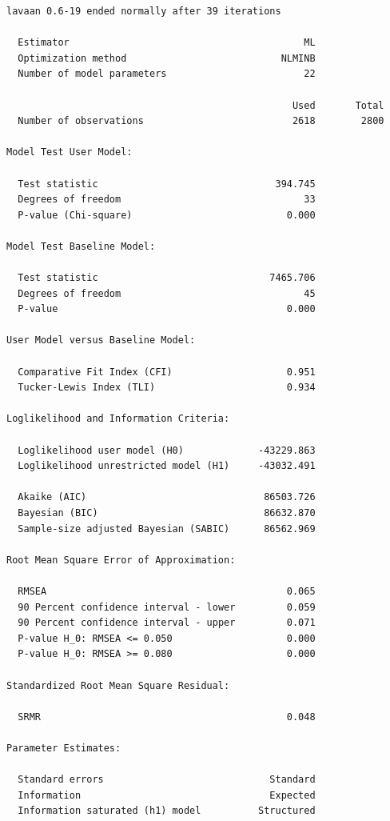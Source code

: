 \documentclass[
  letterpaper,
  DIV=11,
  numbers=noendperiod]{scrreprt}
\begin{document}
\begin{verbatim}
lavaan 0.6-19 ended normally after 39 iterations

  Estimator                                         ML
  Optimization method                           NLMINB
  Number of model parameters                        22

                                                  Used       Total
  Number of observations                          2618        2800

Model Test User Model:
                                                      
  Test statistic                               394.745
  Degrees of freedom                                33
  P-value (Chi-square)                           0.000

Model Test Baseline Model:

  Test statistic                              7465.706
  Degrees of freedom                                45
  P-value                                        0.000

User Model versus Baseline Model:

  Comparative Fit Index (CFI)                    0.951
  Tucker-Lewis Index (TLI)                       0.934

Loglikelihood and Information Criteria:

  Loglikelihood user model (H0)             -43229.863
  Loglikelihood unrestricted model (H1)     -43032.491
                                                      
  Akaike (AIC)                               86503.726
  Bayesian (BIC)                             86632.870
  Sample-size adjusted Bayesian (SABIC)      86562.969

Root Mean Square Error of Approximation:

  RMSEA                                          0.065
  90 Percent confidence interval - lower         0.059
  90 Percent confidence interval - upper         0.071
  P-value H_0: RMSEA <= 0.050                    0.000
  P-value H_0: RMSEA >= 0.080                    0.000

Standardized Root Mean Square Residual:

  SRMR                                           0.048

Parameter Estimates:

  Standard errors                             Standard
  Information                                 Expected
  Information saturated (h1) model          Structured


\end{verbatim}
\end{document}
